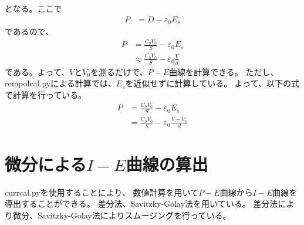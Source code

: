 \documentclass[a4j,dvipdfmx]{jsarticle}
\begin{document}
となる。ここで
\begin{align}
    P&=D-\varepsilon_{0}E_{s}
\end{align}
であるので、
\begin{align}
    P&=\frac{C_{0}V_{0}}{S}-\varepsilon_{0}E_{s}\\
    &\approx \frac{C_{0}V_{0}}{S}-\varepsilon_{0}\frac{V}{d}
\end{align}
である。よって、$V$と$V_{0}$を測るだけで、$P-E$曲線を計算できる。
ただし、rempolcal.pyによる計算では、$E_{s}$を近似せずに計算している。
よって、以下の式で計算を行っている。
\begin{align}
    P&=\frac{C_{0}V_{0}}{S}-\varepsilon_{0}E_{s}\\
    &=\frac{C_{0}V_{0}}{S}-\varepsilon_{0}\frac{V-V_{0}}{d}
\end{align}
\section{微分による$I-E$曲線の算出}
currcal.pyを使用することにより、
数値計算を用いて$P-E$曲線から$I-E$曲線を導出することができる。
差分法、Savitzky-Golay法を用いている。
差分法により微分、Savitzky-Golay法によりスムージングを行っている。
\end{document}

